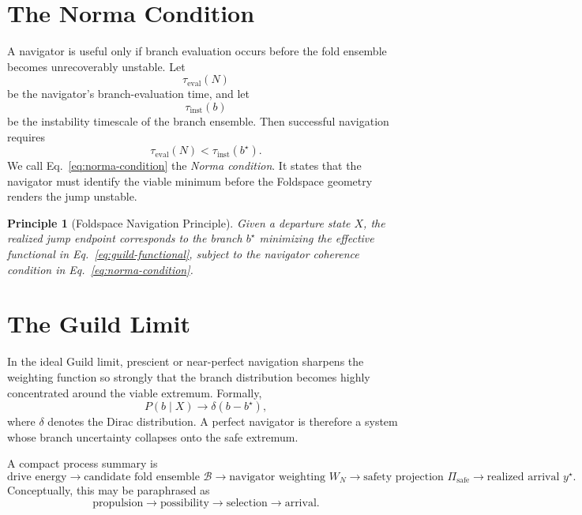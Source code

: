 \documentclass[11pt]{article}
\newtheorem{principle}{Principle}
\begin{document}
\section{The Norma Condition}
A navigator is useful only if branch evaluation occurs before the fold ensemble becomes unrecoverably unstable. Let
\begin{equation}
\tau_{\mathrm{eval}}(N)
\end{equation}
be the navigator's branch-evaluation time, and let
\begin{equation}
\tau_{\mathrm{inst}}(b)
\end{equation}
be the instability timescale of the branch ensemble. Then successful navigation requires
\begin{equation}
\tau_{\mathrm{eval}}(N) < \tau_{\mathrm{inst}}(b^{\star}).
\label{eq:norma-condition}
\end{equation}
We call Eq.~\eqref{eq:norma-condition} the \emph{Norma condition}. It states that the navigator must identify the viable minimum before the Foldspace geometry renders the jump unstable.

\begin{principle}[Foldspace Navigation Principle]
Given a departure state $X$, the realized jump endpoint corresponds to the branch $b^{\star}$ minimizing the effective functional in Eq.~\eqref{eq:guild-functional}, subject to the navigator coherence condition in Eq.~\eqref{eq:norma-condition}.
\end{principle}

\section{The Guild Limit}
In the ideal Guild limit, prescient or near-perfect navigation sharpens the weighting function so strongly that the branch distribution becomes highly concentrated around the viable extremum. Formally,
\begin{equation}
P(b \mid X) \to \delta(b - b^{\star}),
\end{equation}
where $\delta$ denotes the Dirac distribution. A perfect navigator is therefore a system whose branch uncertainty collapses onto the safe extremum.

A compact process summary is
\begin{equation}
\text{drive energy}
\rightarrow
\text{candidate fold ensemble } \mathcal{B}
\rightarrow
\text{navigator weighting } W_N
\rightarrow
\text{safety projection } \Pi_{\mathrm{safe}}
\rightarrow
\text{realized arrival } y^{\star}.
\end{equation}
Conceptually, this may be paraphrased as
\begin{equation}
\text{propulsion} \rightarrow \text{possibility} \rightarrow \text{selection} \rightarrow \text{arrival}.
\end{equation}
\end{document}
